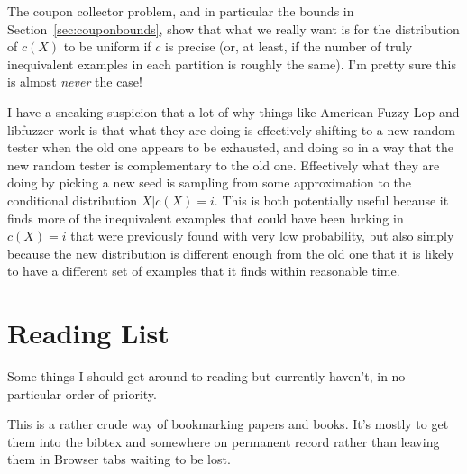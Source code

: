 \documentclass[a4paper]{book}
\begin{document}
The coupon collector problem, and in particular the bounds in Section~\ref{sec:couponbounds},
show that what we really want is for the distribution of \(c(X)\) to be uniform if \(c\) is precise (or, at least, if the number of truly inequivalent examples in each partition is roughly the same).
I'm pretty sure this is almost \emph{never} the case!

I have a sneaking suspicion that a lot of why things like American Fuzzy Lop and libfuzzer work is that what they are doing is effectively shifting to a new random tester when the old one appears to be exhausted,
and doing so in a way that the new random tester is complementary to the old one.
Effectively what they are doing by picking a new seed is sampling from some approximation to the conditional distribution \(X|c(X) = i\).
This is both potentially useful because it finds more of the inequivalent examples that could have been lurking in \(c(X) = i\) that were previously found with very low probability,
but also simply because the new distribution is different enough from the old one that it is likely to have a different set of examples that it finds within reasonable time.

\chapter{Reading List}

Some things I should get around to reading but currently haven't,
in no particular order of priority.

This is a rather crude way of bookmarking papers and books.
It's mostly to get them into the bibtex and somewhere on permanent record rather than leaving them in Browser tabs waiting to be lost.
\end{document}
